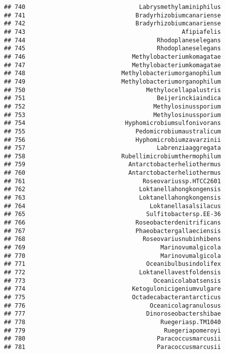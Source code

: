 \documentclass[
]{article}
\begin{document}
\begin{verbatim}
## 740                                Labrysmethylaminiphilus
## 741                               Bradyrhizobiumcanariense
## 742                               Bradyrhizobiumcanariense
## 743                                            Afipiafelis
## 744                                     Rhodoplaneselegans
## 745                                     Rhodoplaneselegans
## 746                              Methylobacteriumkomagatae
## 747                              Methylobacteriumkomagatae
## 748                           Methylobacteriumorganophilum
## 749                           Methylobacteriumorganophilum
## 750                                  Methylocellapalustris
## 751                                     Beijerinckiaindica
## 752                                    Methylosinussporium
## 753                                    Methylosinussporium
## 754                            Hyphomicrobiumsulfonivorans
## 755                               Pedomicrobiumaustralicum
## 756                               Hyphomicrobiumzavarzinii
## 757                                     Labrenziaaggregata
## 758                           Rubellimicrobiumthermophilum
## 759                             Antarctobacterheliothermus
## 760                             Antarctobacterheliothermus
## 761                                 Roseovariussp.HTCC2601
## 762                                Loktanellahongkongensis
## 763                                Loktanellahongkongensis
## 764                                   Loktanellasalsilacus
## 765                                  Sulfitobactersp.EE-36
## 766                               Roseobacterdenitrificans
## 767                               Phaeobactergallaeciensis
## 768                                 Roseovariusnubinhibens
## 769                                      Marinovumalgicola
## 770                                      Marinovumalgicola
## 771                                  Oceanibulbusindolifex
## 772                                Loktanellavestfoldensis
## 773                                    Oceanicolabatsensis
## 774                              Ketogulonicigeniumvulgare
## 775                              Octadecabacterantarcticus
## 776                                   Oceanicolagranulosus
## 777                                  Dinoroseobactershibae
## 778                                      Ruegeriasp.TM1040
## 779                                       Ruegeriapomeroyi
## 780                                     Paracoccusmarcusii
## 781                                     Paracoccusmarcusii

\end{verbatim}
\end{document}
